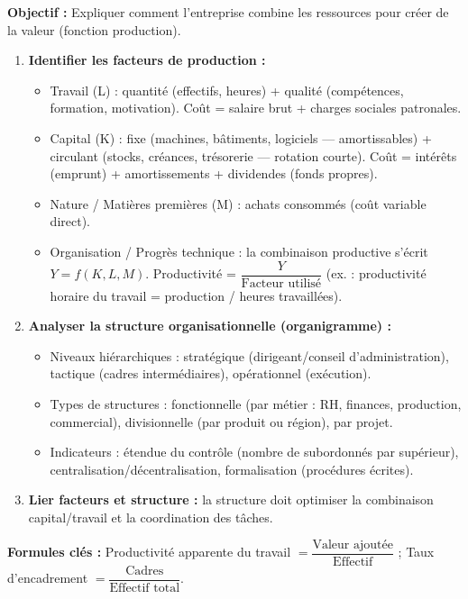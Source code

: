 \documentclass[11pt]{article}
\newcommand{\cle}[1]{{\popxbold\color{popdark}#1}}
\begin{document}
\begin{methode}
    \textbf{Objectif :} Expliquer comment l'entreprise combine les ressources pour créer de la valeur (fonction production).
    \begin{enumerate}
        \item \textbf{Identifier les facteurs de production :}
              \begin{itemize}
                  \item \cle{Travail (L)} : quantité (effectifs, heures) + qualité (compétences, formation, motivation). Coût = salaire brut + charges sociales patronales.
                  \item \cle{Capital (K)} : fixe (machines, bâtiments, logiciels — amortissables) + circulant (stocks, créances, trésorerie — rotation courte). Coût = intérêts (emprunt) + amortissements + dividendes (fonds propres).
                  \item \cle{Nature / Matières premières (M)} : achats consommés (coût variable direct).
                  \item \cle{Organisation / Progrès technique} : la combinaison productive s'écrit $Y = f(K, L, M)$. \cle{Productivité} = $\dfrac{Y}{\text{Facteur utilisé}}$ (ex. : productivité horaire du travail = production / heures travaillées).
              \end{itemize}
        \item \textbf{Analyser la structure organisationnelle (organigramme) :}
              \begin{itemize}
                  \item \cle{Niveaux hiérarchiques} : stratégique (dirigeant/conseil d'administration), tactique (cadres intermédiaires), opérationnel (exécution).
                  \item \cle{Types de structures} : fonctionnelle (par métier : RH, finances, production, commercial), divisionnelle (par produit ou région), par projet.
                  \item \cle{Indicateurs} : \cle{étendue du contrôle} (nombre de subordonnés par supérieur), \cle{centralisation/décentralisation}, \cle{formalisation} (procédures écrites).
              \end{itemize}
        \item \textbf{Lier facteurs et structure :} la structure doit optimiser la combinaison capital/travail et la coordination des tâches.
    \end{enumerate}
    \textbf{Formules clés :} \cle{Productivité apparente du travail} $= \dfrac{\text{Valeur ajoutée}}{\text{Effectif}}$ ; \cle{Taux d'encadrement} $= \dfrac{\text{Cadres}}{\text{Effectif total}}$.
\end{methode}
\end{document}
